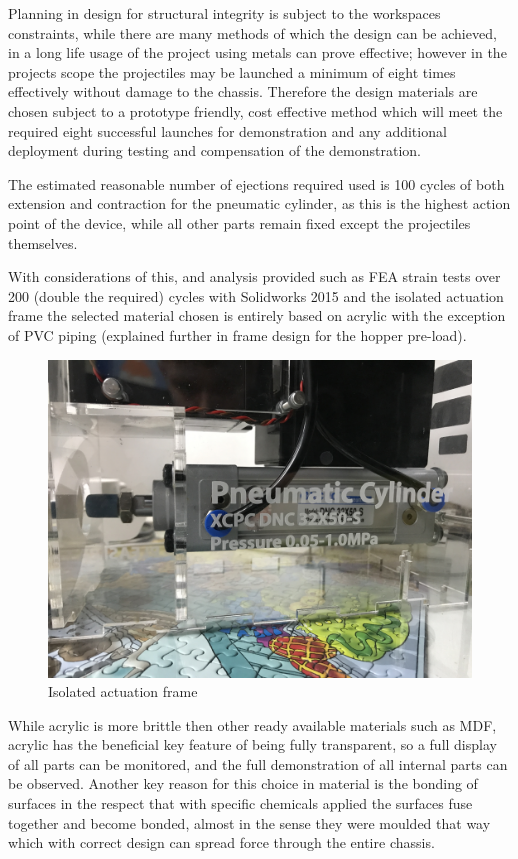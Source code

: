 \documentclass[a4paper, 10pt]{IEEEconf}
\begin{document}
Planning in design for structural integrity is subject to the workspaces constraints, while there are many methods of which the design can be achieved, in a long life usage of the project using metals can prove effective; however in the projects scope the projectiles may be launched a minimum of eight times effectively without damage to the chassis. Therefore the design materials are chosen subject to a prototype friendly, cost effective method which will meet the required eight successful launches for demonstration and any additional deployment during testing and compensation of the demonstration. 

The estimated reasonable number of ejections required used is 100 cycles of both extension and contraction for the pneumatic cylinder, as this is the highest action point of the device, while all other parts remain fixed except the projectiles themselves. 

With considerations of this, and analysis provided such as FEA strain tests over 200 (double the required) cycles with Solidworks 2015 and the isolated actuation frame the selected material chosen is entirely based on acrylic with the exception of PVC piping (explained further in frame design for the hopper pre-load). 

\begin{figure}[H]
  \includegraphics[width=\linewidth]{images/cylinder}
  \caption{Isolated actuation frame}
  \label{fig:Isolated actuation frame}
\end{figure}

While acrylic is more brittle then other ready available materials such as MDF, acrylic has the beneficial key feature of being fully transparent, so a full display of all parts can be monitored, and the full demonstration of all internal parts can be observed. Another key reason for this choice in material is the bonding of surfaces in the respect that with specific chemicals applied the surfaces fuse together and become bonded, almost in the sense they were moulded that way which with correct design can spread force through the entire chassis.
\end{document}
